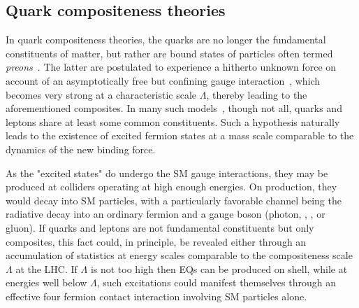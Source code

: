 \subsection{Quark compositeness theories}
\label{subsec:theory:bsm:qstar}

In quark compositeness theories, the quarks are no longer the fundamental constituents of matter, but rather are bound states of particles often termed \textit{preons}~\cite{Pfeil-1981}. The latter are postulated to experience a hitherto unknown force on account of an asymptotically free but confining gauge interaction~\cite{Hooft-1980}, which becomes very strong at a characteristic scale \(\Lambda\), thereby leading to the aforementioned composites. In many such models~\cite{Pati_Salam_Strathdee-1975,Fritzsch_Mandelbaum-1981,Baur_Fritzsch-1984}, though not all, quarks and leptons share at least some common constituents. Such a hypothesis naturally leads to the existence of excited fermion states at a mass scale comparable to the dynamics of the new binding force.

As the "excited states" do undergo the \ac{SM} gauge interactions, they may be produced at colliders operating at high enough energies. On production, they would decay into \ac{SM} particles, with a particularly favorable channel being the radiative decay into an ordinary fermion and a gauge boson (photon, \Wboson, \Zboson, or gluon). If quarks and leptons are not fundamental constituents but only composites, this fact could, in principle, be revealed either through an accumulation of statistics at energy scales comparable to the compositeness scale \(\Lambda\) at the \ac{LHC}. If \(\Lambda\) is not too high then \ac{EQ}s can be produced on shell, while at energies well below \(\Lambda\), such excitations could manifest themselves through an effective four fermion contact interaction involving \ac{SM} particles alone. 

